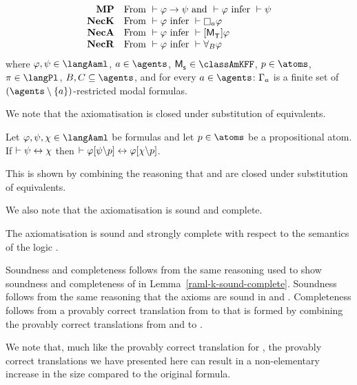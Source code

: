 \begin{definition}
$$\begin{array}{rl}
    {\bf MP}    & \text{From } \proves \phi \implies \psi \text{ and } \proves \phi \text{ infer } \proves \psi\\
    {\bf NecK}  & \text{From } \proves \phi \text{ infer } \proves \necessaryA \phi\\
    {\bf NecA} & \text{From } \proves \phi \text{ infer } \proves \actionA{\aPModel{\aStatesT}} \phi\\
    {\bf NecR} & \text{From } \proves \phi \text{ infer } \proves \allrefsBs \phi
\end{array}
$$
where $\phi, \psi \in \langAaml$, $\agentA \in \agents$, $\aPModel{\aStateS} \in \classAmKFF$, $\atomP \in \atoms$, $\pi \in \langPl$, $\agentsB, \agentsC \subseteq \agents$, and for every $\agentA \in \agents$: $\Gamma_a$ is a finite set of $(\agents \setminus \{\agentA\})$-restricted modal formulas.
\end{definition}

We note that the axiomatisation \axiomRamlKFF{} is closed under substitution of equivalents.

\begin{lemma}
Let $\phi, \psi, \chi \in \langAaml$ be formulas and let $\atomP \in \atoms$ be a propositional atom.
If $\vdash \psi \leftrightarrow \chi$ then $\vdash \varphi[\psi\backslash p] \leftrightarrow \varphi[\chi\backslash p]$.
\end{lemma}

This is shown by combining the reasoning that \axiomAmlKFF{} and \axiomRmlKFF{} are closed under substitution of equivalents.

We also note that the axiomatisation \axiomRamlKFF{} is sound and complete.

\begin{lemma}\label{raml-k45-sound-complete}
The axiomatisation \axiomRamlKFF{} is sound and strongly complete with respect to the semantics of the logic \logicRamlKFF{}.
\end{lemma}

Soundness and completeness follows from the same reasoning used to show soundness and completeness of \axiomRamlK{} in Lemma~\ref{raml-k-sound-complete}.
Soundness follows from the same reasoning that the axioms are sound in \logicAmlKFF{} and \logicRmlKFF{}.
Completeness follows from a provably correct translation from \langAaml{} to \langMl{} that is formed by combining the provably correct translations from \langAml{} and \langRml{} to \langMl{}.

We note that, much like the provably correct translation for \logicRmlS{}, the provably correct translations we have presented here can result in a non-elementary increase in the size compared to the original formula.

